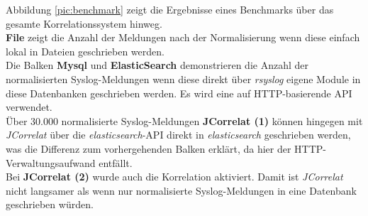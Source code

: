 Abbildung \ref{pic:benchmark} zeigt die Ergebnisse eines Benchmarks über das gesamte 
Korrelationssystem hinweg.\\

\textbf{File} zeigt die Anzahl der Meldungen nach der 
Normalisierung wenn diese einfach lokal in Dateien geschrieben werden.\\
Die Balken \textbf{Mysql} und \textbf{ElasticSearch} demonstrieren die Anzahl der 
normalisierten Syslog-Meldungen wenn diese direkt über \textit{rsyslog} eigene Module in 
diese Datenbanken geschrieben werden. Es wird eine auf HTTP-basierende API verwendet.\\
Über 30.000 normalisierte Syslog-Meldungen \textbf{JCorrelat (1)} können hingegen mit 
\textit{JCorrelat} über die \textit{elasticsearch}-API direkt in \textit{elasticsearch} 
geschrieben werden, was die Differenz zum vorhergehenden Balken erklärt, da hier der 
HTTP-Verwaltungsaufwand entfällt.\\
Bei \textbf{JCorrelat (2)} wurde auch die Korrelation aktiviert. Damit ist 
\textit{JCorrelat} nicht langsamer als wenn nur normalisierte Syslog-Meldungen in eine 
Datenbank geschrieben würden. 






 